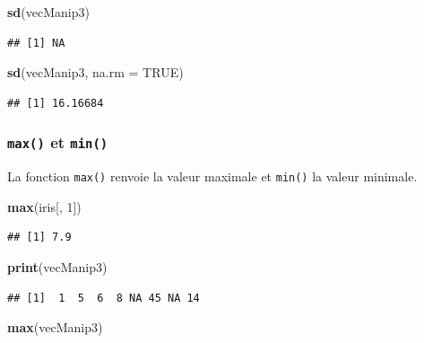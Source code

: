 \documentclass[
]{book}
\newenvironment{Shaded}{\begin{snugshade}}{\end{snugshade}}
\newcommand{\DataTypeTok}[1]{\textcolor[rgb]{0.13,0.29,0.53}{#1}}
\newcommand{\DecValTok}[1]{\textcolor[rgb]{0.00,0.00,0.81}{#1}}
\newcommand{\KeywordTok}[1]{\textcolor[rgb]{0.13,0.29,0.53}{\textbf{#1}}}
\newcommand{\NormalTok}[1]{#1}
\newcommand{\OtherTok}[1]{\textcolor[rgb]{0.56,0.35,0.01}{#1}}
\begin{document}
\begin{Shaded}
\begin{Highlighting}[]
\KeywordTok{sd}\NormalTok{(vecManip3)}
\end{Highlighting}
\end{Shaded}

\begin{verbatim}
## [1] NA
\end{verbatim}

\begin{Shaded}
\begin{Highlighting}[]
\KeywordTok{sd}\NormalTok{(vecManip3, }\DataTypeTok{na.rm =} \OtherTok{TRUE}\NormalTok{)}
\end{Highlighting}
\end{Shaded}

\begin{verbatim}
## [1] 16.16684
\end{verbatim}

\hypertarget{l015max}{%
\subsubsection{\texorpdfstring{\texttt{max()} et \texttt{min()}}{max() et min()}}\label{l015max}}

La fonction \texttt{max()} renvoie la valeur maximale et \texttt{min()} la valeur minimale.

\begin{Shaded}
\begin{Highlighting}[]
\KeywordTok{max}\NormalTok{(iris[, }\DecValTok{1}\NormalTok{])}
\end{Highlighting}
\end{Shaded}

\begin{verbatim}
## [1] 7.9
\end{verbatim}

\begin{Shaded}
\begin{Highlighting}[]
\KeywordTok{print}\NormalTok{(vecManip3)}
\end{Highlighting}
\end{Shaded}

\begin{verbatim}
## [1]  1  5  6  8 NA 45 NA 14
\end{verbatim}

\begin{Shaded}
\begin{Highlighting}[]
\KeywordTok{max}\NormalTok{(vecManip3)}
\end{Highlighting}
\end{Shaded}
\end{document}

